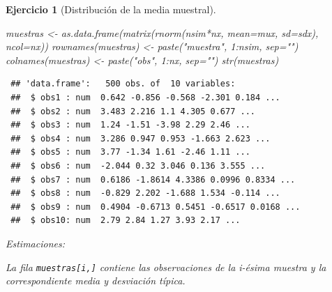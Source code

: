 \documentclass[
]{book}
\newenvironment{Shaded}{\begin{snugshade}}{\end{snugshade}}
\newcommand{\AttributeTok}[1]{\textcolor[rgb]{0.77,0.63,0.00}{#1}}
\newcommand{\DecValTok}[1]{\textcolor[rgb]{0.00,0.00,0.81}{#1}}
\newcommand{\FunctionTok}[1]{\textcolor[rgb]{0.00,0.00,0.00}{#1}}
\newcommand{\NormalTok}[1]{#1}
\newcommand{\OtherTok}[1]{\textcolor[rgb]{0.56,0.35,0.01}{#1}}
\newcommand{\SpecialCharTok}[1]{\textcolor[rgb]{0.00,0.00,0.00}{#1}}
\newcommand{\StringTok}[1]{\textcolor[rgb]{0.31,0.60,0.02}{#1}}
\theoremstyle{break}
\newtheorem{exercise}{Ejercicio}[chapter]
\theoremstyle{nonumberplain}
\begin{document}
\begin{exercise}[Distribución de la media muestral]
\begin{enumerate}
\begin{Shaded}
\begin{Highlighting}[]
\NormalTok{muestras }\OtherTok{\textless{}{-}} \FunctionTok{as.data.frame}\NormalTok{(}\FunctionTok{matrix}\NormalTok{(}\FunctionTok{rnorm}\NormalTok{(nsim}\SpecialCharTok{*}\NormalTok{nx, }\AttributeTok{mean=}\NormalTok{mux, }\AttributeTok{sd=}\NormalTok{sdx), }\AttributeTok{ncol=}\NormalTok{nx))}
\FunctionTok{rownames}\NormalTok{(muestras) }\OtherTok{\textless{}{-}} \FunctionTok{paste}\NormalTok{(}\StringTok{"muestra"}\NormalTok{, }\DecValTok{1}\SpecialCharTok{:}\NormalTok{nsim, }\AttributeTok{sep=}\StringTok{""}\NormalTok{)}
\FunctionTok{colnames}\NormalTok{(muestras) }\OtherTok{\textless{}{-}} \FunctionTok{paste}\NormalTok{(}\StringTok{"obs"}\NormalTok{, }\DecValTok{1}\SpecialCharTok{:}\NormalTok{nx, }\AttributeTok{sep=}\StringTok{""}\NormalTok{)}
\FunctionTok{str}\NormalTok{(muestras)}
\end{Highlighting}
\end{Shaded}

\begin{verbatim}
 ## 'data.frame':   500 obs. of  10 variables:
 ##  $ obs1 : num  0.642 -0.856 -0.568 -2.301 0.184 ...
 ##  $ obs2 : num  3.483 2.216 1.1 4.305 0.677 ...
 ##  $ obs3 : num  1.24 -1.51 -3.98 2.29 2.46 ...
 ##  $ obs4 : num  3.286 0.947 0.953 -1.663 2.623 ...
 ##  $ obs5 : num  3.77 -1.34 1.61 -2.46 1.11 ...
 ##  $ obs6 : num  -2.044 0.32 3.046 0.136 3.555 ...
 ##  $ obs7 : num  0.6186 -1.8614 4.3386 0.0996 0.8334 ...
 ##  $ obs8 : num  -0.829 2.202 -1.688 1.534 -0.114 ...
 ##  $ obs9 : num  0.4904 -0.6713 0.5451 -0.6517 0.0168 ...
 ##  $ obs10: num  2.79 2.84 1.27 3.93 2.17 ...
\end{verbatim}

  Estimaciones:

\begin{Shaded}
\end{Shaded}

  La fila \texttt{muestras{[}i,{]}} contiene las observaciones de la i-ésima muestra y
  la correspondiente media y desviación típica.


\end{enumerate}
\end{exercise}
\end{document}

